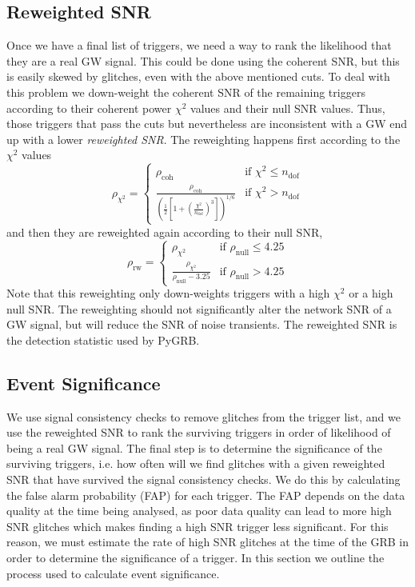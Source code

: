 \documentclass[11pt]{cuthesis}
\begin{document}
\subsection{Reweighted SNR} \label{sec:reweighted snr}
Once we have a final list of triggers, we need a way to rank the likelihood that they are a real GW signal. This could be done using the coherent SNR, but this is easily skewed by glitches, even with the above mentioned cuts. To deal with this problem we down-weight the coherent SNR of the remaining triggers according to their coherent power $\chi^2$ values and their null SNR values. Thus, those triggers that pass the cuts but nevertheless are inconsistent with a GW end up with a lower \textit{reweighted SNR}. The reweighting happens first according to the $\chi^2$ values
\begin{equation}  \label{chi2 reweigth}
\rho_{\chi^2} = \begin{cases} \rho_\text{coh} & \mbox{if } \chi^2 \leq n_\text{dof} \\ \frac{\rho_\text{coh}}{\left( \frac{1}{2} \left[ 1 + \left( \frac{\chi^2}{n_\text{dof}} \right)^3 \right] \right)^{1/6} } & \mbox{if } \chi^2 > n_\text{dof}\end{cases}
\end{equation}  
and then they are reweighted again according to their null SNR,
\begin{equation} \label{null reweight}
\rho_\text{rw} = \begin{cases} \rho_{\chi^2} & \mbox{if } \rho_\text{null} \leq 4.25 \\ \frac{\rho_{\chi^2}}{ \rho_\text{null} -3.25} & \mbox{if } \rho_\text{null} > 4.25\end{cases}
\end{equation}
Note that this reweighting only down-weights triggers with a high $\chi^2$ or a high null SNR. The reweighting should not significantly alter the network SNR of a GW signal, but will reduce the SNR of noise transients. The reweighted SNR is the detection statistic used by PyGRB. 





\subsection{Event Significance} \label{sec:event sig}
We use signal consistency checks to remove glitches from the trigger list, and we use the reweighted SNR to rank the surviving triggers in order of likelihood of being a real GW signal. The final step is to determine the significance of the surviving triggers, i.e. how often will we find glitches with a given reweighted SNR that have survived the signal consistency checks. We do this by calculating the false alarm probability (FAP) for each trigger. The FAP depends on the data quality at the time being analysed, as poor data quality can lead to more high SNR glitches which makes finding a high SNR trigger less significant. For this reason, we must estimate the rate of high SNR glitches at the time of the GRB in order to determine the significance of a trigger. In this section we outline the process used to calculate event significance. 
\end{document}
